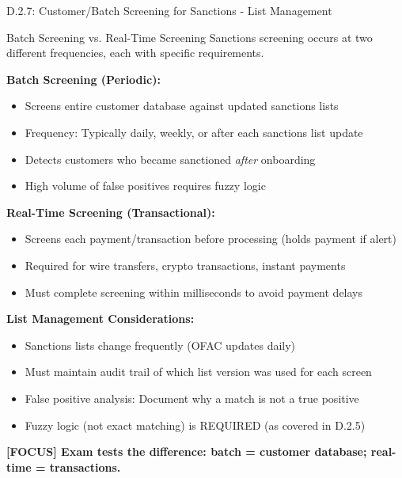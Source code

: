 \documentclass[11pt,a4paper]{beamer}
\newcommand{\examfocus}[1]{\textcolor{orange!80!black}{\textbf{[FOCUS] #1}}}
\begin{document}
\begin{frame}{D.2.7: Customer/Batch Screening for Sanctions - List Management}
	\begin{block}{Batch Screening vs. Real-Time Screening}
		Sanctions screening occurs at two different frequencies, each with specific requirements.
	\end{block}
	\textbf{Batch Screening (Periodic):}
	\begin{itemize}
		\item Screens entire customer database against updated sanctions lists
		\item Frequency: Typically daily, weekly, or after each sanctions list update
		\item Detects customers who became sanctioned \textit{after} onboarding
		\item High volume of false positives requires fuzzy logic
	\end{itemize}
	\textbf{Real-Time Screening (Transactional):}
	\begin{itemize}
		\item Screens each payment/transaction before processing (holds payment if alert)
		\item Required for wire transfers, crypto transactions, instant payments
		\item Must complete screening within milliseconds to avoid payment delays
	\end{itemize}
	\textbf{List Management Considerations:}
	\begin{itemize}
		\item Sanctions lists change frequently (OFAC updates daily)
		\item Must maintain audit trail of which list version was used for each screen
		\item False positive analysis: Document why a match is not a true positive
		\item Fuzzy logic (not exact matching) is REQUIRED (as covered in D.2.5)
	\end{itemize}
	\examfocus{Exam tests the difference: batch = customer database; real-time = transactions.}
\end{frame}
\end{document}
